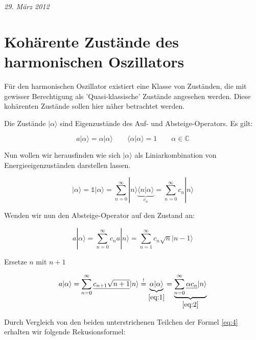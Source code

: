



\textit{29. März 2012}


\section*{Kohärente Zustände des harmonischen Oszillators}

Für den harmonischen Oszillator existiert eine Klasse von Zuständen, die mit gewisser Berechtigung als 'Quasi-klassische' Zustände angesehen werden. Diese kohärenten Zustände sollen hier näher betrachtet werden.

Die Zustände \(|\alpha\rangle \) sind Eigenzustände des Auf- und Absteige-Operators. Es gilt:

\begin{equation}
  \label{eq:1}
  a|\alpha\rangle =\alpha|\alpha\rangle \qquad \langle \alpha | \alpha \rangle =1 \qquad \alpha \in \mathbb C
\end{equation}


Nun wollen wir herausfinden wie sich \(|\alpha\rangle\) als Liniarkombination von Energieeigenzuständen darstellen lassen. 

\begin{equation}
  \label{eq:2}
  |\alpha\rangle = \mathbb 1 |\alpha\rangle = \sum_{n=0}^{\infty}|n\rangle\underbrace{ \langle n|\alpha\rangle }_{c_n} = \sum_{n=0}^{\infty} c_n|n\rangle 
\end{equation}

Wenden wir nun den Absteige-Operator auf den Zustand an:

\begin{equation}
  \label{eq:3}
  a|\alpha\rangle = \sum_{n=0}^{\infty} c_n a|n\rangle=\sum_{n=1}^{\infty} c_n \sqrt{n}|n-1\rangle
\end{equation}

Ersetze \(n\) mit \(n+1\)

\begin{equation}
  \label{eq:4}
  a|\alpha\rangle = \sum_{n=0}^{\infty} \underline{c_{n+1} \sqrt{n+1}}|n\rangle \stackrel{!}= \underbrace{ \alpha|\alpha\rangle}_{\eqref{eq:1}}  = \underbrace{ \sum_{n=0}^{\infty} \underline{\alpha c_n} |n\rangle }_{\eqref{eq:2} }
\end{equation}

Durch Vergleich von den beiden unterstrichenen Teilchen der Formel \eqref{eq:4} erhalten wir folgende Rekusionsformel:

